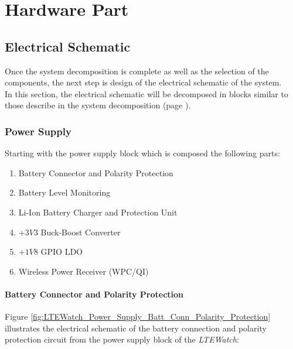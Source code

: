 \documentclass[report.tex]{subfiles}
\begin{document}
\chapter{Hardware Part}

\section{Electrical Schematic}

Once the system decomposition is complete as well as the selection of the components, the next step is design of the electrical schematic of the system.\\

In this section, the electrical schematic will be decomposed in blocks similar to those describe in the system decomposition (page \pageref{sec:sys_func_dec}).

\subsection{Power Supply}

Starting with the power supply block which is composed the following parts:
\begin{enumerate}
\item Battery Connector and Polarity Protection
\item Battery Level Monitoring
\item Li-Ion Battery Charger and Protection Unit
\item $+3V3$ Buck-Boost Converter
\item $+1V8$ GPIO LDO
\item Wireless Power Receiver (WPC/QI)
\end{enumerate}

\subsubsection{Battery Connector and Polarity Protection}

Figure \ref{fig:LTEWatch_Power_Supply_Batt_Conn_Polarity_Protection} illustrates the electrical schematic of the battery connection and polarity protection circuit from the power supply block of the \textit{LTEWatch}:
\end{document}

